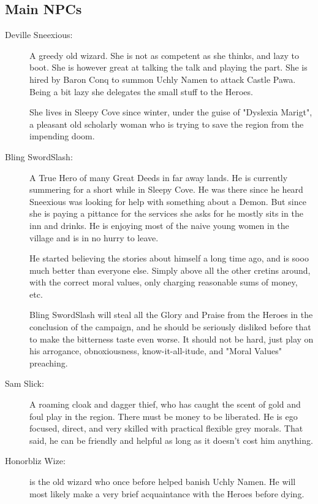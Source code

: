 \subsection*{Main NPCs}

\begin{description}

\item[Deville Sneexious:] A greedy old wizard. She is not as competent as she thinks, and lazy to boot. She is however great at talking the talk and playing the part. She is hired by Baron Conq to summon Uchly Namen to attack Castle Pawa. Being a bit lazy she delegates the small stuff to the Heroes.

She lives in Sleepy Cove since winter, under the guise of "Dyslexia Marigt", a pleasant old scholarly woman who is trying to save the region from the impending doom.


\item[Bling SwordSlash:] A True Hero of many Great Deeds in far away lands. He is currently summering for a short while in Sleepy Cove. He was there since he heard Sneexious was looking for help with something about a Demon. But since she is paying a pittance for the services she asks for he mostly sits in the inn and drinks. He is enjoying most of the naive young women in the village and is in no hurry to leave.

He started believing the stories about himself a long time ago, and is sooo much better than everyone else. Simply above all the other cretins around, with the correct moral values, only charging reasonable sums of money, etc.

Bling SwordSlash will steal all the Glory and Praise from the Heroes in the conclusion of the campaign, and he should be seriously disliked before that to make the bitterness taste even worse. It should not be hard, just play on his arrogance, obnoxiousness, know-it-all-itude, and "Moral Values" preaching.


\item[Sam Slick:] A roaming cloak and dagger thief, who has caught the scent of gold and foul play in the region. There must be money to be liberated. He is ego focused, direct, and very skilled with practical flexible grey morals. That said, he can be friendly and helpful as long as it doesn't cost him anything.


\item[Honorbliz Wize:] is the old wizard who once before helped banish Uchly Namen. He will most likely make a very brief acquaintance with the Heroes before dying.



\end{description}
